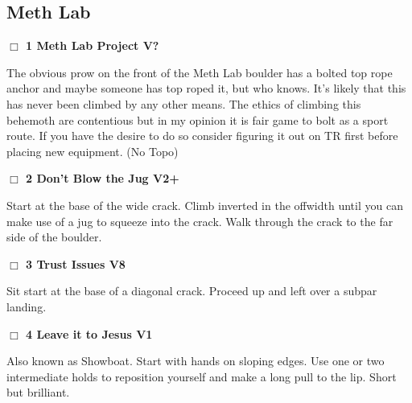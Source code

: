 	\begin{multicols}{2}


\needspace{1.5cm}
\subsection*{Meth Lab}\label{bf:Meth Lab}
	


\needspace{1.5cm}
\label{rt:Meth Lab Project}
\colorbox{black!20}{
\parbox{0.95\linewidth}{
\hspace{-1ex}\textbf{$\Box$
1 Meth Lab Project V?  \warn\warn\warn
}}}
\begin{adjustwidth}{1.3em}{}			
The obvious prow on the front of the Meth Lab boulder has a bolted top rope anchor and maybe someone has top roped it, but who knows. It's likely that this has never been climbed by any other means. The ethics of climbing this behemoth are contentious but in my opinion it is fair game to bolt as a sport route. If you have the desire to do so consider figuring it out on TR first before placing new equipment.
  (No Topo)
\end{adjustwidth}




\needspace{1.5cm}
\label{rt:Don't Blow the Jug}
\colorbox{green!20}{
\parbox{0.95\linewidth}{
\hspace{-1ex}\textbf{$\Box$
2 Don't Blow the Jug V2+  \warn
}}}
\begin{adjustwidth}{1.3em}{}			
Start at the base of the wide crack. Climb inverted in the offwidth until you can make use of a jug to squeeze into the crack. Walk through the crack to the far side of the boulder.
\end{adjustwidth}




\needspace{1.5cm}
\label{rt:Trust Issues}
\colorbox{Goldenrod!20}{
\parbox{0.95\linewidth}{
\hspace{-1ex}\textbf{$\Box$
3 Trust Issues V8  \warn\warn
}}}
\begin{adjustwidth}{1.3em}{}			
Sit start at the base of a diagonal crack. Proceed up and left over a subpar landing.
\end{adjustwidth}




\needspace{1.5cm}
\label{rt:Leave it to Jesus}
\colorbox{green!20}{
\parbox{0.95\linewidth}{
\hspace{-1ex}\textbf{$\Box$
4 Leave it to Jesus V1  
}}}
\begin{adjustwidth}{1.3em}{}			
Also known as Showboat. Start with hands on sloping edges. Use one or two intermediate holds to reposition yourself and make a long pull to the lip. Short but brilliant.
\end{adjustwidth}



\end{multicols}
